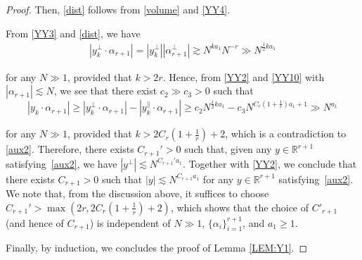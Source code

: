 \documentclass[10pt,a4paper]{amsart}
\newcommand{\R}{\mathbb{R}}
\newcommand{\al}{\alpha}
\newcommand{\ges}{\gtrsim}
\newcommand{\les}{\lesssim}
\newcommand{\noi}{\noindent}
\begin{document}
\begin{proof}
\noi
Then, \eqref{dist} follows from \eqref{volume}
and \eqref{YY4}.


From \eqref{YY3} and \eqref{dist}, we have 
\begin{align}
|y_k^\perp \cdot \al_{r+1}| = |y_k^\perp| |\al^\perp_{r+1}| 
 \ges N^{k  a_1} N^{-r} \gg N^{\frac 12 k a_1}
\label{YY10}
\end{align}


\noi
for any $N \gg1$, provided that $k > 2r$.
Hence, 
from \eqref{YY2} and  \eqref{YY10} with $|\al_{r+1}| \les N$, 
we see that there exist $c_2 \gg c_3 > 0$ such that 
\[
|y_k \cdot \al_{r+1}| \ge |y_k^\perp \cdot \al_{r+1}| - |y_k^\parallel \cdot \al_{r+1}| 
\ge c_2 N^{\frac 12 k a_1} - c_3 N^{C_r (1+ \frac 1r) a_1 + 1}
\gg N^{a_1} 
\]

\noi
for any $N \gg 1$, provided that 
$k > 2  C_r (1+ \frac 1r) +2$, 
which is a contradiction to \eqref{aux2}.
Therefore, 
there exists  $C_{r+1}' > 0$ such that, 
given any $y \in \R^{r+1}$
satisfying~\eqref{aux2}, 
we have 
 $|y^\perp| \les N^{C_{r+1}' a_1}$.
 Together with \eqref{YY2}, we conclude that  
there exists $C_{r+1} > 0$ such that 
 $|y|\les N^{C_{r+1}a_1}$ for 
 any $y \in \R^{r+1}$
satisfying~\eqref{aux2}.
We note that, from the discussion above, 
it suffices to choose $C_{r+1}' > \max(2r, 
2C_r (1+ \frac 1r) +2)$, 
which shows that the choice of $C'_{r+1}$ (and hence of $C_{r+1}$)
is independent of $N \gg1$, 
$\{\al_i \}_{i=1}^{r+1}$,  and $a_1\ge 1$.

Finally, by induction, we 
 concludes the proof of Lemma \ref{LEM:Y1}.
\end{proof}
\end{document}
